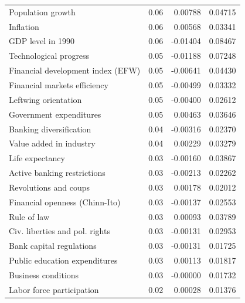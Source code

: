 \begin{refsection}
\begin{subappendices}
\begin{table}[!ht]
\begin{tabular}{lrrr}
      Population growth & 0.06 & 0.00788 & 0.04715 \\ 
      Inflation & 0.06 & 0.00568 & 0.03341 \\ 
      GDP level in 1990 & 0.06 & -0.01404 & 0.08467 \\ 
      Technological progress & 0.05 & -0.01188 & 0.07248 \\ 
      Financial development index (EFW) & 0.05 & -0.00641 & 0.04430 \\ 
      Financial markets efficiency & 0.05 & -0.00499 & 0.03332 \\ 
      Leftwing orientation & 0.05 & -0.00400 & 0.02612 \\ 
      Government expenditures & 0.05 & 0.00463 & 0.03646 \\ 
      Banking diversification & 0.04 & -0.00316 & 0.02370 \\ 
      Value added in industry & 0.04 & 0.00229 & 0.03279 \\ 
      Life expectancy & 0.03 & -0.00160 & 0.03867 \\ 
      Active banking restrictions & 0.03 & -0.00213 & 0.02262 \\ 
      Revolutions and coups & 0.03 & 0.00178 & 0.02012 \\ 
      Financial openness (Chinn-Ito) & 0.03 & -0.00137 & 0.02553 \\ 
      Rule of law & 0.03 & 0.00093 & 0.03789 \\ 
      Civ. liberties and pol. rights & 0.03 & -0.00131 & 0.02953 \\ 
      Bank capital regulations & 0.03 & -0.00131 & 0.01725 \\ 
      Public education expenditures & 0.03 & 0.00113 & 0.01817 \\ 
      Business conditions & 0.03 & -0.00000 & 0.01732 \\ 
      Labor force participation & 0.02 & 0.00028 & 0.01376 \\  
      \bottomrule
    \end{tabular}
    \end{table}
    
    \clearpage
    

\end{subappendices}
\end{refsection}
